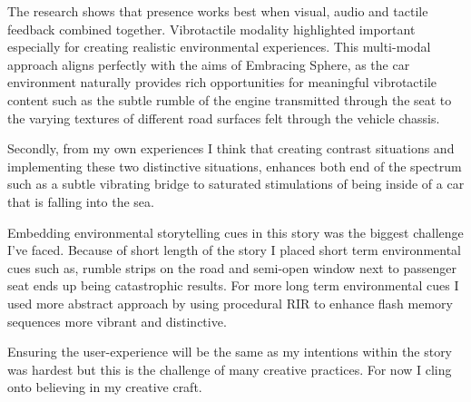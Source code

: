         The research shows that presence works best when visual, audio and tactile feedback combined together. Vibrotactile modality highlighted important especially for creating realistic environmental experiences. This multi-modal approach aligns perfectly with the aims of Embracing Sphere, as the car environment naturally provides rich opportunities for meaningful vibrotactile content such as the subtle rumble of the engine transmitted through the seat to the varying textures of different road surfaces felt through the vehicle chassis.\par

        Secondly, from my own experiences I think that creating contrast situations and implementing these two distinctive situations, enhances both end of the spectrum such as a subtle vibrating bridge to saturated stimulations of being inside of a car that is falling into the sea.\par

        Embedding environmental storytelling cues in this story was the biggest challenge I've faced. Because of short length of the story I placed short term environmental cues such as, rumble strips on the road and semi-open window next to passenger seat ends up being catastrophic results. For more long term environmental cues I used more abstract approach by using procedural RIR to enhance flash memory sequences more vibrant and distinctive.\par

        Ensuring the user-experience will be the same as my intentions within the story was hardest but this is the challenge of many creative practices. For now I cling onto believing in my creative craft.\par